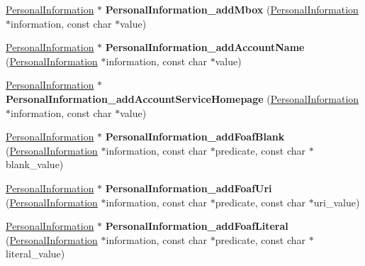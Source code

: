 \begin{DoxyCompactItemize}
\hyperlink{classomexmeta_1_1PersonalInformation}{Personal\+Information} $\ast$ {\bfseries Personal\+Information\+\_\+add\+Mbox} (\hyperlink{classomexmeta_1_1PersonalInformation}{Personal\+Information} $\ast$information, const char $\ast$value)
\item 
\mbox{\label{namespaceomexmeta_a75306b1329c755b124ad9b40f147abdc}} 
\hyperlink{classomexmeta_1_1PersonalInformation}{Personal\+Information} $\ast$ {\bfseries Personal\+Information\+\_\+add\+Account\+Name} (\hyperlink{classomexmeta_1_1PersonalInformation}{Personal\+Information} $\ast$information, const char $\ast$value)
\item 
\mbox{\label{namespaceomexmeta_ad597791b54c6f08a3572033aab6487dd}} 
\hyperlink{classomexmeta_1_1PersonalInformation}{Personal\+Information} $\ast$ {\bfseries Personal\+Information\+\_\+add\+Account\+Service\+Homepage} (\hyperlink{classomexmeta_1_1PersonalInformation}{Personal\+Information} $\ast$information, const char $\ast$value)
\item 
\mbox{\label{namespaceomexmeta_ac131d8bd8df53e89fa1256a0be45358d}} 
\hyperlink{classomexmeta_1_1PersonalInformation}{Personal\+Information} $\ast$ {\bfseries Personal\+Information\+\_\+add\+Foaf\+Blank} (\hyperlink{classomexmeta_1_1PersonalInformation}{Personal\+Information} $\ast$information, const char $\ast$predicate, const char $\ast$blank\+\_\+value)
\item 
\mbox{\label{namespaceomexmeta_a31ecc9357011658fa6785451886a0b64}} 
\hyperlink{classomexmeta_1_1PersonalInformation}{Personal\+Information} $\ast$ {\bfseries Personal\+Information\+\_\+add\+Foaf\+Uri} (\hyperlink{classomexmeta_1_1PersonalInformation}{Personal\+Information} $\ast$information, const char $\ast$predicate, const char $\ast$uri\+\_\+value)
\item 
\mbox{\label{namespaceomexmeta_a692328b7caa5527bf1f5ff86e7077637}} 
\hyperlink{classomexmeta_1_1PersonalInformation}{Personal\+Information} $\ast$ {\bfseries Personal\+Information\+\_\+add\+Foaf\+Literal} (\hyperlink{classomexmeta_1_1PersonalInformation}{Personal\+Information} $\ast$information, const char $\ast$predicate, const char $\ast$literal\+\_\+value)
\item 
\mbox{\label{namespaceomexmeta_a6edcf0c8af06246bb3344ff3f4ea7a21}} 

\end{DoxyCompactItemize}
